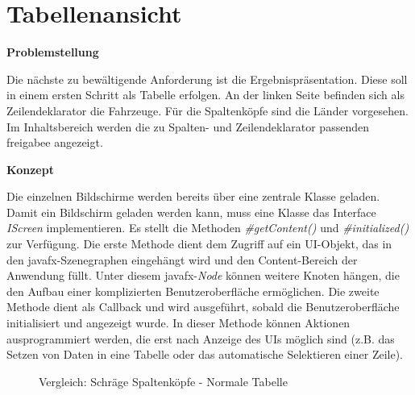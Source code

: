 \section{Tabellenansicht} \label{sec:implTabelle}
\textbf{Problemstellung}

Die nächste zu bewältigende Anforderung ist die Ergebnispräsentation. Diese soll in einem ersten Schritt als Tabelle erfolgen. An der linken Seite befinden sich als Zeilendeklarator die Fahrzeuge. Für die Spaltenköpfe sind die Länder vorgesehen. Im Inhaltsbereich werden die zu Spalten- und Zeilendeklarator passenden \gls{freigabe}e angezeigt. 

\textbf{Konzept}

Die einzelnen Bildschirme werden bereits über eine zentrale Klasse geladen. Damit ein Bildschirm geladen werden kann, muss eine Klasse das Interface \textit{IScreen} implementieren. Es stellt die Methoden \textit{\#getContent()} und \textit{\#initialized()} zur Verfügung. Die erste Methode dient dem Zugriff auf ein UI-Objekt, das in den \gls{javafx}-Szenegraphen eingehängt wird und den Content-Bereich der Anwendung füllt. Unter diesem \gls{javafx}-\textit{Node} können weitere Knoten hängen, die den Aufbau einer komplizierten Benutzeroberfläche ermöglichen. Die zweite Methode dient als Callback und wird ausgeführt, sobald die Benutzeroberfläche initialisiert und angezeigt wurde. In dieser Methode können Aktionen ausprogrammiert werden, die erst nach Anzeige des UIs möglich sind (z.B. das Setzen von Daten in eine Tabelle oder das automatische Selektieren einer Zeile).

\begin{figure}[H] 
	\centering
	\hspace{2.0em}
	\caption{Vergleich: Schräge Spaltenköpfe - Normale Tabelle}
	\label{fig:tabelle1}
\end{figure}



